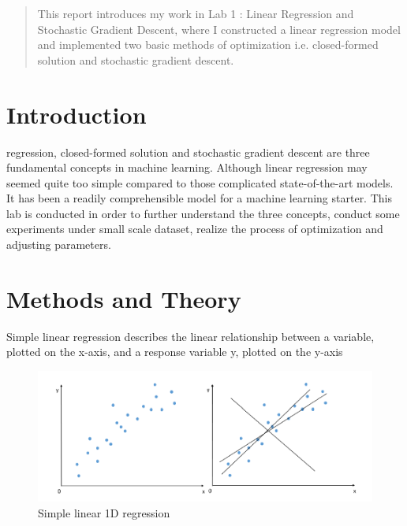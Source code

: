 \documentclass[journal, a4paper]{IEEEtran}
\begin{document}
\begin{abstract}
This report introduces my work in Lab 1 : Linear Regression and Stochastic Gradient Descent, where I constructed a linear regression model and implemented two basic methods of optimization i.e. closed-formed solution and stochastic gradient descent.
\end{abstract}

\section{Introduction}
 regression, closed-formed solution and stochastic gradient descent are three fundamental concepts in machine learning. Although linear regression may seemed quite too simple compared to those complicated state-of-the-art models. It has been a readily comprehensible model for a machine learning starter. This lab is conducted in order to further understand the three concepts, conduct some experiments under small scale dataset, realize the process of optimization and adjusting parameters.

\section{Methods and Theory}
Simple linear regression describes the linear relationship between a variable, plotted on the x-axis, and a response variable y, plotted on the y-axis \\
\begin{figure}[!hbt]
		\centering
		\includegraphics[width=\columnwidth]{linearRe.png}
		\caption{Simple linear 1D regression}
		\label{fig1}
\end{figure}
\end{document}
